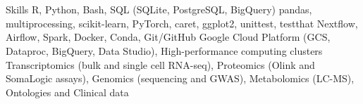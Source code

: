 \section{\faGears}{Skills}
 \resumeEntryStart
   {R, Python, Bash, SQL (SQLite, PostgreSQL, BigQuery)}
   {pandas, multiprocessing, scikit-learn, PyTorch, caret, ggplot2, unittest, testthat}
   {Nextflow, Airflow, Spark, Docker, Conda, Git/GitHub}  %
   {Google Cloud Platform (GCS, Dataproc, BigQuery, Data Studio), High-performance computing clusters}
   {Transcriptomics (bulk and single cell RNA-seq), Proteomics (Olink and SomaLogic assays), Genomics (sequencing and GWAS), Metabolomics (LC-MS), Ontologies and Clinical data}
 \resumeEntryEnd

\vspace{5pt}
